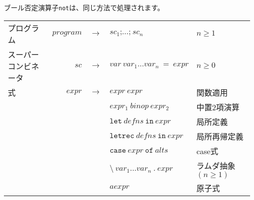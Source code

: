 \documentclass{jarticle}
\begin{document}
ブール否定演算子\texttt{not}は、同じ方法で処理されます。

\begin{center}
	\begin{tabular} {|l r c l l|} \hline
		プログラム           & $program$ & $\rightarrow$ & $sc_1 \texttt{;} \ldots \texttt{;} ~ sc_n$                                                                                                                       & $n \geq 1$              \\
		スーパーコンビネータ & $sc$      & $\rightarrow$ & $var ~ var_1 \ldots var_n ~ = ~ expr$                                                                                                                            & $n \geq 0$              \\
		式                   & $expr$    & $\rightarrow$ & $expr ~ expr$                                                                                                                                                    & 関数適用                \\
		                     &           & \textbar      & $expr_1 ~ binop ~ expr_2$                                                                                                                                        & 中置2項演算             \\
		                     &           & \textbar      & $\texttt{let} ~ defns ~ \texttt{in} ~ expr$                                                                                                                      & 局所定義                \\
		                     &           & \textbar      & $\texttt{letrec} ~ defns ~ \texttt{in} ~ expr$                                                                                                                   & 局所再帰定義            \\
		                     &           & \textbar      & $\texttt{case} ~ expr ~ \texttt{of} ~ alts$                                                                                                                      & case式                  \\
		                     &           & \textbar      & $\texttt{\textbackslash} ~ var_1 \ldots var_n ~ \texttt{.} ~ expr$                                                                                               & ラムダ抽象 $(n \geq 1)$ \\
		                     &           & \textbar      & $aexpr$                                                                                                                                                          & 原子式                  \\

\end{tabular}
\end{center}
\end{document}
